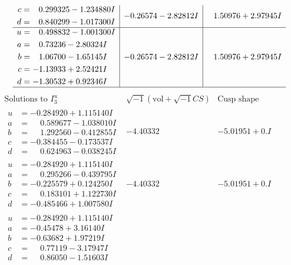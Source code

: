 \documentclass[1p]{elsarticle_modified}
\theoremstyle{definition}
\newcommand{\I}{\sqrt{-1}}
\begin{document}
$$\begin{array}{c|c|c}
\begin{aligned}
c &= \phantom{-}0.299325 - 1.234880 I \\
d &= \phantom{-}0.840299 - 1.017300 I\end{aligned}
 & -0.26574 - 2.82812 I & \phantom{-}1.50976 + 2.97945 I \\ \hline\begin{aligned}
u &= \phantom{-}0.498832 - 1.001300 I \\
a &= \phantom{-}0.73236 - 2.80324 I \\
b &= \phantom{-}1.06700 - 1.65145 I \\
c &= -1.13933 + 2.52421 I \\
d &= -1.30532 + 0.92346 I\end{aligned}
 & -0.26574 - 2.82812 I & \phantom{-}1.50976 + 2.97945 I\\
 \hline 
 \end{array}$$\newpage$$\begin{array}{c|c|c}  
\text{Solutions to }I^u_{3}& \I (\text{vol} + \sqrt{-1}CS) & \text{Cusp shape}\\
 \hline 
\begin{aligned}
u &= -0.284920 + 1.115140 I \\
a &= \phantom{-}0.589677 - 1.038010 I \\
b &= \phantom{-}1.292560 - 0.412855 I \\
c &= -0.384455 - 0.173537 I \\
d &= \phantom{-}0.624963 - 0.038245 I\end{aligned}
 & -4.40332\phantom{ +0.000000I} & -5.01951 + 0. I\phantom{ +0.000000I} \\ \hline\begin{aligned}
u &= -0.284920 + 1.115140 I \\
a &= \phantom{-}0.295266 - 0.439795 I \\
b &= -0.225579 + 0.124250 I \\
c &= \phantom{-}0.183101 + 1.122730 I \\
d &= -0.485466 + 1.007580 I\end{aligned}
 & -4.40332\phantom{ +0.000000I} & -5.01951 + 0. I\phantom{ +0.000000I} \\ \hline\begin{aligned}
u &= -0.284920 + 1.115140 I \\
a &= -0.45478 + 3.16140 I \\
b &= -0.63682 + 1.97219 I \\
c &= \phantom{-}0.77119 - 3.17947 I \\
d &= \phantom{-}0.86050 - 1.51603 I\end{aligned}

\end{array}$$
\end{document}
